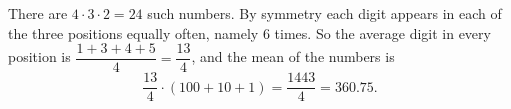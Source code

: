 There are $4\cdot3\cdot2=24$ such numbers. By symmetry each digit appears in each of the three positions equally often, namely $6$ times. So the average digit in every position is $\dfrac{1+3+4+5}{4}=\dfrac{13}{4}$, and the mean of the numbers is
\[\dfrac{13}{4}\cdot(100+10+1)=\dfrac{1443}{4}=\boxed{360.75}.\]
